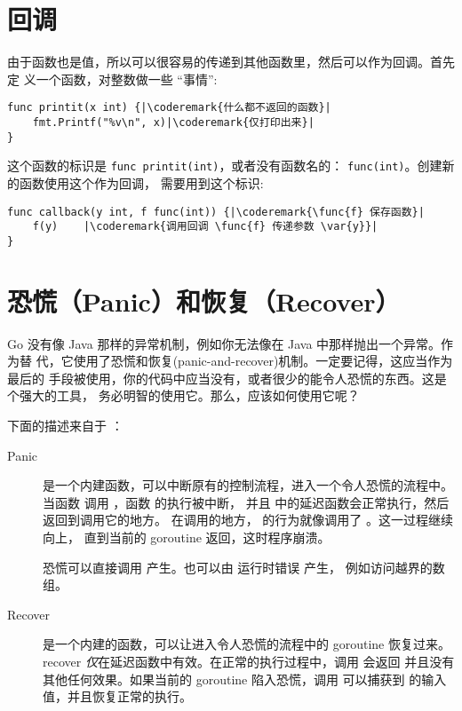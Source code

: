 \section{回调}
\label{sec:callbacks}
由于函数也是值，所以可以很容易的传递到其他函数里，然后可以作为回调。首先定
义一个函数，对整数做一些 “事情”:
\begin{lstlisting}
func printit(x int) {|\coderemark{什么都不返回的函数}|
    fmt.Printf("%v\n", x)|\coderemark{仅打印出来}|
}
\end{lstlisting}
这个函数的标识是 \lstinline{func printit(int)}，或者没有函数名的：
\mbox{\lstinline{func(int)}}。创建新的函数使用这个作为回调，
需要用到这个标识:
\begin{lstlisting}
func callback(y int, f func(int)) {|\coderemark{\func{f} 保存函数}|
    f(y)    |\coderemark{调用回调 \func{f} 传递参数 \var{y}}|
}
\end{lstlisting}

\section{恐慌（Panic）和恢复（Recover）}
\label{sec:panic}
Go 没有像 Java 那样的异常机制，例如你无法像在 Java 中那样抛出一个异常。作为替
代，它使用了恐慌和恢复(panic-and-recover)机制。一定要记得，这应当作为最后的
手段被使用，你的代码中应当没有，或者很少的能令人恐慌的东西。这是个强大的工具，
务必明智的使用它。那么，应该如何使用它呢？

下面的描述来自于 \cite{go_blog_panic}：
\begin{description}
\item[Panic]{
		是一个内建函数，可以中断原有的控制流程，进入一个令人恐慌的流程中。
		当函数  调用 ，函数  的执行被中断，
		并且  中的延迟函数会正常执行，然后  返回到调用它的地方。
		在调用的地方， 的行为就像调用了 。这一过程继续向上，
		直到当前的 goroutine 返回，这时程序崩溃。

		恐慌可以直接调用  产生。也可以由 运行时错误 产生，
		例如访问越界的数组。}

\item[Recover]{
		是一个内建的函数，可以让进入令人恐慌的流程中的 goroutine 恢复过来。
		recover \emph{仅}在延迟函数中有效。在正常的执行过程中，调用 
		 会返回  并且没有其他任何效果。如果当前的 
		goroutine 陷入恐慌，调用  可以捕获到  
	的输入值，并且恢复正常的执行。}
\end{description}

